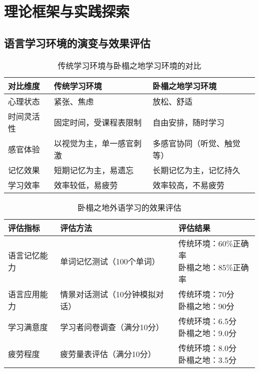 \section{理论框架与实践探索}

\subsection{语言学习环境的演变与效果评估}


\begin{table}[htbp]
\centering
\caption{传统学习环境与卧榻之地学习环境的对比}
\begin{tabular}{lll}
\toprule
\textbf{对比维度}       & \textbf{传统学习环境}                  & \textbf{卧榻之地学习环境}                                \\
\midrule
心理状态       & 紧张、焦虑                        & 放松、舒适                     \\
时间灵活性     & 固定时间，受课程表限制            & 自由安排，随时学习                 \\
感官体验       & 以视觉为主，单一感官刺激          & 多感官协同（听觉、触觉等）               \\
记忆效果       & 短期记忆为主，易遗忘              & 长期记忆为主，记忆持久                 \\
学习效率       & 效率较低，易疲劳                  & 效率较高，不易疲劳                         \\
\bottomrule
\end{tabular}
\end{table}



\begin{table}[htbp]
\centering
\caption{卧榻之地外语学习的效果评估}
\begin{tabular}{lll}
\toprule
\textbf{评估指标}       & \textbf{评估方法}                     & \textbf{评估结果}                \\
\midrule

语言记忆能力   & 单词记忆测试（100个单词）        & \makecell{传统环境：60\%正确率\\ 卧榻之地：85\%正确率}      \\
\hline %
语言应用能力   & 情景对话测试（10分钟模拟对话）   & \makecell{传统环境：70分\\ 卧榻之地：90分}           \\
\hline %
学习满意度     & 学习者问卷调查（满分10分）       & \makecell{传统环境：6.5分\\ 卧榻之地：9.0分}        \\
\hline %
疲劳程度       & 疲劳量表评估（满分10分）         & \makecell{传统环境：8.0分\\ 卧榻之地：3.5分}         \\

\bottomrule
\end{tabular}
\end{table}

